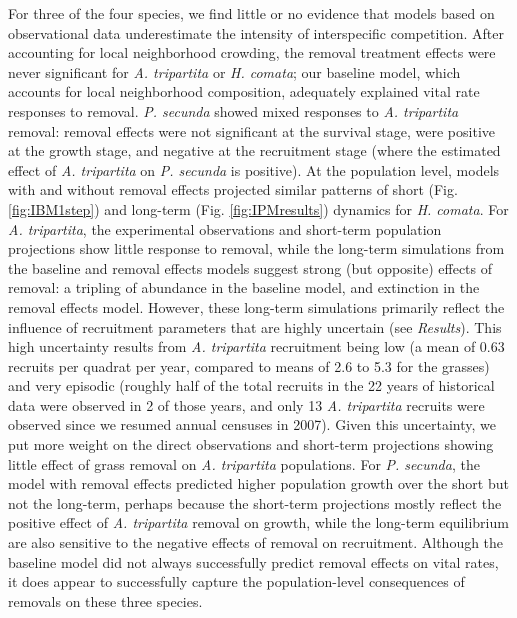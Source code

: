 \documentclass[11pt]{article}
\begin{document}
\begin{doublespacing}
For three of the four species, we find little or no evidence that models based on observational data underestimate 
the intensity of interspecific competition. After accounting 
for local neighborhood crowding, the removal treatment effects were never significant for \textit{A. tripartita} or \textit{H. comata}; 
our baseline model, which accounts for local neighborhood composition, adequately explained vital rate responses to removal.  
\textit{P. secunda} showed mixed responses to \textit{A. tripartita} removal: removal effects were not significant at the survival stage, 
were positive at the growth stage, and negative at the recruitment stage (where the estimated effect of \textit{A. tripartita} 
on \textit{P. secunda} is positive). At the population level, models with and without removal effects projected similar patterns of 
short (Fig. \ref{fig:IBM1step}) and long-term (Fig. \ref{fig:IPMresults}) dynamics for \textit{H. comata}. For \textit{A. tripartita}, 
the experimental observations and short-term population projections show little response to removal, while the long-term simulations 
from the baseline and removal effects models suggest strong (but opposite) effects of removal: a tripling of abundance in the baseline model, and extinction in the removal effects model. However, these long-term simulations primarily reflect the influence of recruitment parameters 
that are highly uncertain (see \emph{Results}). This high uncertainty 
results from \textit{A. tripartita} recruitment being low (a mean of 0.63 recruits per quadrat per year, compared to means of 2.6 to 5.3 for the grasses) and 
very episodic (roughly half of the total recruits in the 22 years of historical data were observed in 2 of those years, and only 13 \textit{A. tripartita} 
recruits were observed since we resumed annual censuses in 2007). Given this uncertainty, we put more weight on the direct observations 
and short-term projections showing little effect of grass removal on \textit{A. tripartita} populations.
For \textit{P. secunda}, the model with removal effects predicted higher population growth over the short but not the long-term, perhaps 
because the short-term projections mostly reflect the positive effect of \textit{A. tripartita} removal on growth, while the long-term 
equilibrium are also sensitive to the negative effects of removal on recruitment. Although the baseline model did 
not always successfully predict removal effects on vital rates, it does appear to successfully capture the population-level 
consequences of removals on these three species.


\end{doublespacing}
\end{document}
